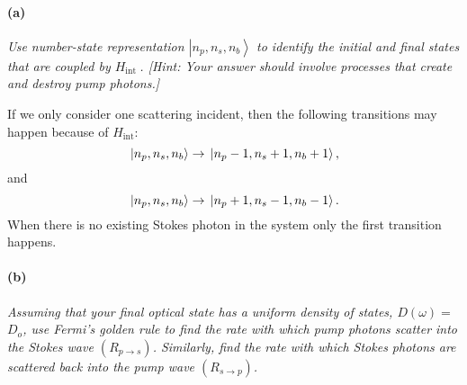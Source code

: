 \documentclass[hyperref, a4paper]{article}
\begin{document}
\paragraph*{(a)} \textit{
    Use number-state representation $\left|n_p, n_s, n_b\right\rangle$ to identify the initial and final states that are coupled by $H_{\text {int }}$. [Hint: Your answer should involve processes that create and destroy pump photons.]
}

If we only consider one scattering incident, then the following transitions may happen because of $H_{\text{int}}$:
\begin{equation}
    \ket*{n_p, n_s, n_b} \to \ket*{n_p - 1, n_s + 1, n_b + 1},
\end{equation}
and 
\begin{equation}
    \ket*{n_p, n_s, n_b} \to \ket*{n_p + 1, n_s - 1, n_b - 1}.
\end{equation}
When there is no existing Stokes photon in the system only the first transition happens.

\paragraph*{(b)} \textit{
    Assuming that your final optical state has a uniform density of states, $D(\omega)=$ $D_o$, use Fermi's golden rule to find the rate with which pump photons scatter into the Stokes wave $\left(R_{p \rightarrow s}\right)$. Similarly, find the rate with which Stokes photons are scattered back into the pump wave $\left(R_{s \rightarrow p}\right)$.
} 
\end{document}
